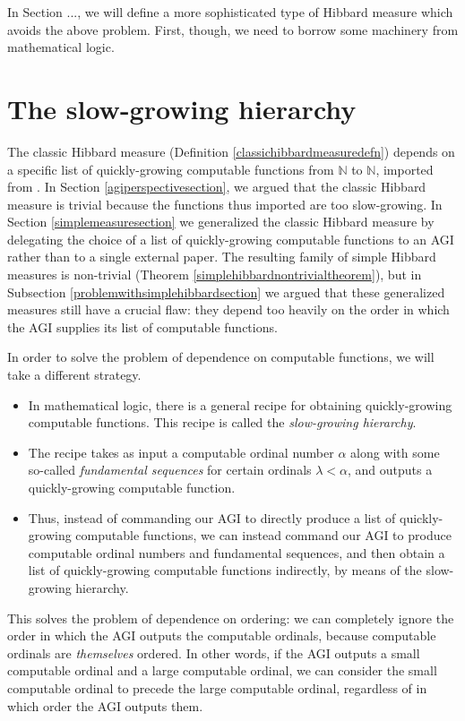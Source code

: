 \documentclass{article}
\begin{document}
In Section ..., we will define a more sophisticated type of Hibbard measure
which avoids the above problem. First, though, we need to borrow some machinery
from mathematical logic.

\section{The slow-growing hierarchy}
\label{slowgrowinghierarchysection}

The classic Hibbard measure
(Definition \ref{classichibbardmeasuredefn}) depends on a specific list of
quickly-growing computable functions from $\mathbb N$ to $\mathbb N$, imported from
\cite{liu1960enumeration}. In Section \ref{agiperspectivesection}, we argued
that the classic Hibbard measure is trivial because the functions thus imported
are too slow-growing.
In Section \ref{simplemeasuresection} we generalized
the classic Hibbard measure
by delegating the choice of a list of quickly-growing computable functions to an AGI rather
than to a single external paper. The resulting family of simple Hibbard measures is
non-trivial (Theorem \ref{simplehibbardnontrivialtheorem}), but in
Subsection \ref{problemwithsimplehibbardsection} we argued that these generalized
measures still have a crucial flaw: they depend too heavily on the order in which
the AGI supplies its list of computable functions.

In order to solve the problem of dependence on computable functions, we will take
a different strategy.
\begin{itemize}
    \item
    In mathematical logic, there is a general recipe for obtaining
    quickly-growing computable
    functions. This recipe is called the \emph{slow-growing hierarchy}.
    \item
    The recipe takes as input a computable
    ordinal number $\alpha$ along with some so-called \emph{fundamental
    sequences} for certain ordinals $\lambda<\alpha$, and outputs
    a quickly-growing computable function.
    \item
    Thus, instead of
    commanding our AGI to directly produce a list of quickly-growing computable functions,
    we can instead command our AGI to produce computable ordinal numbers and
    fundamental sequences, and then obtain a list of quickly-growing
    computable functions indirectly, by means of the slow-growing hierarchy.
\end{itemize}
This solves the problem of dependence on ordering: we can completely ignore the order
in which the AGI outputs the computable ordinals, because computable ordinals are
\emph{themselves} ordered. In other words, if the AGI outputs a small computable ordinal
and a large computable ordinal, we can consider the small computable ordinal to precede
the large computable ordinal, regardless of in which order the AGI outputs them.
\end{document}
